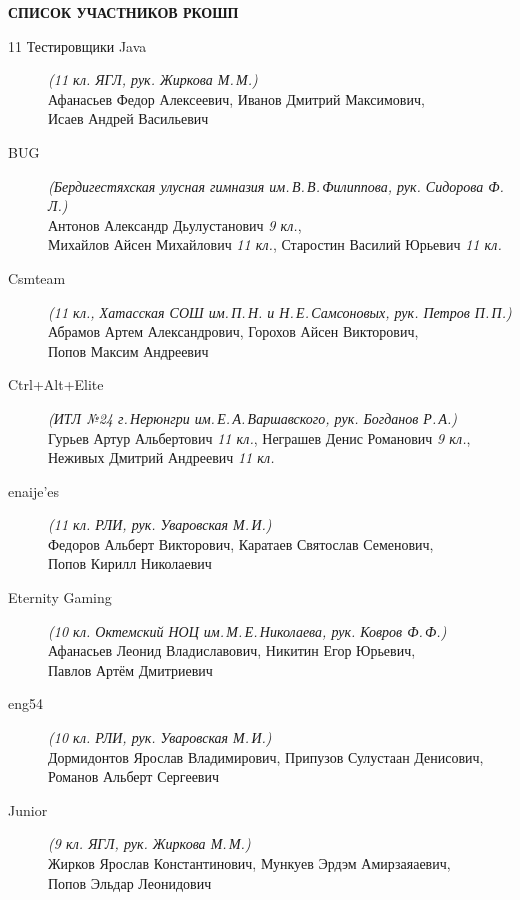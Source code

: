 \newpage
\noindent
\textbf{СПИСОК УЧАСТНИКОВ РКОШП}
\begin{description}

\item[11 Тестировщики Java] \textit{(11 кл. ЯГЛ, рук. Жиркова М.\,М.)} \\
Афанасьев Федор Алексеевич, Иванов Дмитрий Максимович, \\
Исаев Андрей Васильевич

\item[BUG] \textit{(Бердигестяхская улусная гимназия им.\,В.\,В.\,Филиппова, рук. Сидорова Ф.\,Л.)} \\
Антонов Александр Дьулустанович \textit{9 кл.}, \\
Михайлов Айсен Михайлович \textit{11 кл.}, Старостин Василий Юрьевич \textit{11 кл.}

\item[Csmteam] \textit{(11 кл., Хатасская СОШ им.\,П.\,Н. и Н.\,Е.\,Самсоновых, рук. Петров П.\,П.)} \\
Абрамов Артем Александрович, Горохов Айсен Викторович, \\
Попов Максим Андреевич

\item[Ctrl+Alt+Elite] \textit{(ИТЛ №24 г.\,Нерюнгри им.\,Е.\,А.\,Варшавского, рук. Богданов Р.\,А.)} \\
Гурьев Артур Альбертович \textit{11 кл.}, Неграшев Денис Романович \textit{9 кл.}, \\
Неживых Дмитрий Андреевич \textit{11 кл.}

\item[enaije'es] \textit{(11 кл. РЛИ, рук. Уваровская М.\,И.)} \\
Федоров Альберт Викторович, Каратаев Святослав Семенович, \\
Попов Кирилл Николаевич

\item[Eternity Gaming] \textit{(10 кл. Октемский НОЦ им.\,М.\,Е.\,Николаева, рук. Ковров Ф.\,Ф.)} \\
Афанасьев Леонид Владиславович, Никитин Егор Юрьевич, \\
Павлов Артём Дмитриевич

\item[eng54] \textit{(10 кл. РЛИ, рук. Уваровская М.\,И.)} \\
Дормидонтов Ярослав Владимирович, Припузов Сулустаан Денисович, \\
Романов Альберт Сергеевич

\item[Junior] \textit{(9 кл. ЯГЛ, рук. Жиркова М.\,М.)} \\
Жирков Ярослав Константинович, Мункуев Эрдэм Амирзаяаевич, \\
Попов Эльдар Леонидович


\end{description}
